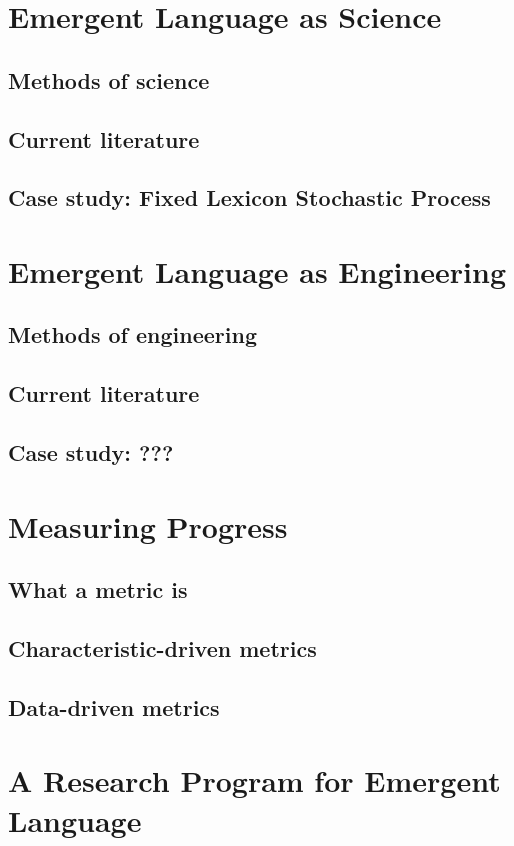 \documentclass[letterpaper]{report}
\begin{document}
\chapter{Emergent Language as Science}
\section{Methods of science}
\section{Current literature}
\section{Case study: Fixed Lexicon Stochastic Process}

\chapter{Emergent Language as Engineering}
\section{Methods of engineering}
\section{Current literature}
\section{Case study: ???}

\chapter{Measuring Progress}
\section{What a metric is}
\section{Characteristic-driven metrics}
\section{Data-driven metrics}

\chapter{A Research Program for Emergent Language}




\end{document}
